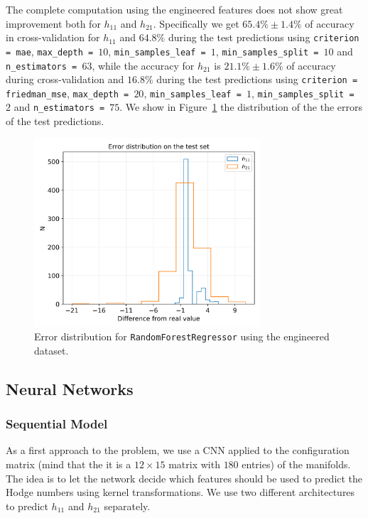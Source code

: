     The complete computation using the engineered features does not show great improvement both for $h_{11}$ and $h_{21}$. Specifically we get $65.4\% \pm 1.4\%$ of accuracy in cross-validation for $h_{11}$ and $64.8\%$ during the test predictions using \texttt{criterion = mae}, \texttt{max\_depth = $10$}, \texttt{min\_samples\_leaf = $1$}, \texttt{min\_samples\_split = $10$} and \texttt{n\_estimators = $63$}, while the accuracy for $h_{21}$ is $21.1\% \pm 1.6\%$ of accuracy during cross-validation and $16.8\%$ during the test predictions using \texttt{criterion = friedman\_mse}, \texttt{max\_depth = $20$}, \texttt{min\_samples\_leaf = $1$}, \texttt{min\_samples\_split = $2$} and \texttt{n\_estimators = $75$}. We show in Figure~\ref{fig:rnd_for_err} the distribution of the the errors of the test predictions.
    
    \begin{figure}[t]
        \centering
        \includegraphics[width=0.75\textwidth]{tex/img/rnd_for_error_eng.png}
        \caption{Error distribution for \texttt{RandomForestRegressor} using the engineered dataset.}
        \label{fig:rnd_for_err}
    \end{figure}
    
\subsection{Neural Networks}

    \subsubsection{Sequential Model}
        As a first approach to the problem, we use a CNN applied to the configuration matrix (mind that the it is a $12 \times 15$ matrix with $180$ entries) of the manifolds. The idea is to let the network decide which features should be used to predict the Hodge numbers using kernel transformations. We use two different architectures to predict $h_{11}$ and $h_{21}$ separately.
        
